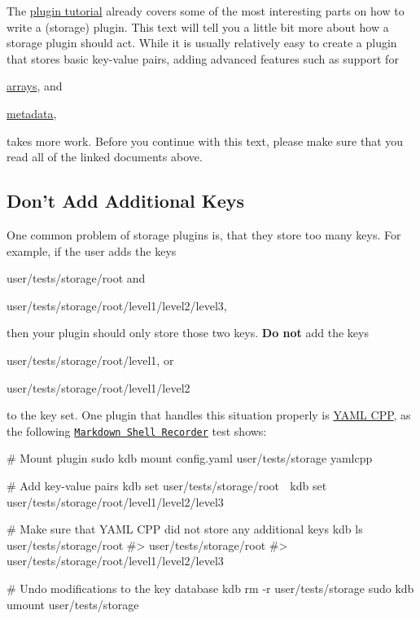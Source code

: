 The \hyperlink{doc_tutorials_plugins_md}{plugin tutorial} already covers some of the most interesting parts on how to write a (storage) plugin. This text will tell you a little bit more about how a storage plugin should act. While it is usually relatively easy to create a plugin that stores basic key-\/value pairs, adding advanced features such as support for


\begin{DoxyItemize}
\item \hyperlink{doc_tutorials_arrays_md}{arrays}, and
\item \hyperlink{doc_dev_metadata_md}{metadata},
\end{DoxyItemize}

takes more work. Before you continue with this text, please make sure that you read all of the linked documents above.

\subsection*{Don’t Add Additional Keys}

One common problem of storage plugins is, that they store too many keys. For example, if the user adds the keys


\begin{DoxyItemize}
\item {\ttfamily user/tests/storage/root} and
\item {\ttfamily user/tests/storage/root/level1/level2/level3},
\end{DoxyItemize}

then your plugin should only store those two keys. {\bfseries Do not} add the keys


\begin{DoxyItemize}
\item {\ttfamily user/tests/storage/root/level1}, or
\item {\ttfamily user/tests/storage/root/level1/level2}
\end{DoxyItemize}

to the key set. One plugin that handles this situation properly is \hyperlink{md_src_plugins_yamlcpp_README_src_plugins_yamlcpp_README_md}{Y\+A\+ML C\+PP}, as the following \href{https://master.libelektra.org/tests/shell/shell_recorder/tutorial_wrapper}{\tt Markdown Shell Recorder} test shows\+:


\begin{DoxyCode}
# Mount plugin
sudo kdb mount config.yaml user/tests/storage yamlcpp

# Add key-value pairs
kdb set user/tests/storage/root 🐓
kdb set user/tests/storage/root/level1/level2/level3 🐣

# Make sure that YAML CPP did not store any additional keys
kdb ls user/tests/storage/root
#> user/tests/storage/root
#> user/tests/storage/root/level1/level2/level3

# Undo modifications to the key database
kdb rm -r user/tests/storage
sudo kdb umount user/tests/storage
\end{DoxyCode}


